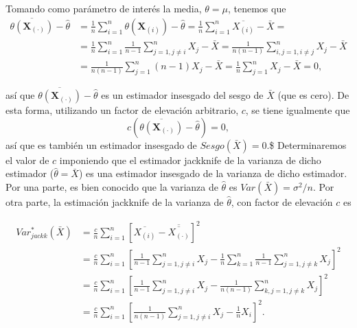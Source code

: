 \documentclass[]{book}
\theoremstyle{definition}
\theoremstyle{definition}
\theoremstyle{definition}
\theoremstyle{remark}
\begin{document}
Tomando como parámetro de interés la media, \(\theta =\mu\), tenemos que
\[\begin{aligned}
\overline{\theta \left( \mathbf{X}_{(\cdot)} \right)}-
\hat{\theta} &= \frac{1}{n}\sum_{i=1}^{n}\theta \left( 
\mathbf{X}_{(i)} \right) -\hat{\theta}=\frac{1}{n}\sum_{i=1}^{n}
\overline{X_{(i)}}-\bar{X}= \\
&= \frac{1}{n}\sum_{i=1}^{n}\frac{1}{n-1}\sum_{j=1,j\neq i}^{n}X_j-
\bar{X}=\frac{1}{n\left( n-1 \right)}\sum_{i,j=1,i\neq j}^{n}X_j-
\bar{X} \\
&= \frac{1}{n\left( n-1 \right)}\sum_{j=1}^{n}\left( n-1 \right) X_j-
\bar{X}=\frac{1}{n}\sum_{j=1}^{n}X_j-\bar{X}=0,\end{aligned}\]

así que
\(\overline{\theta \left( \mathbf{X}_{(\cdot)} \right)}-\hat{\theta}\)
es un estimador insesgado del sesgo de \(\bar{X}\) (que es cero). De
esta forma, utilizando un factor de elevación arbitrario, \(c\), se
tiene igualmente que
\[c\left( \overline{\theta \left( \mathbf{X}_{(\cdot)} \right)}
- \hat{\theta} \right) = 0,\] así que es también un estimador insesgado
de \(Sesgo\left( \bar{X} \right) =0.\)\$ Determinaremos el valor de
\(c\) imponiendo que el estimador jackknife de la varianza de dicho
estimador (\(\hat{\theta}=\bar{X}\)) es una estimador insesgado de la
varianza de dicho estimador. Por una parte, es bien conocido que la
varianza de \(\hat{\theta}\) es
\(Var\left( \bar{X} \right) = \sigma^2 /n\). Por otra parte, la
estimación jackknife de la varianza de \(\hat{\theta}\), con factor de
elevación \(c\) es

\[\begin{aligned}
Var_{jackk}^{\ast}\left( \bar{X} \right) &= \frac{c}{n}\sum_{i=1}^{n}
\left[ \overline{X_{(i)}}-\overline{\overline{X_{\left( \cdot
 \right)}}}\right]^2 \\
&= \frac{c}{n}\sum_{i=1}^{n}\left[ \frac{1}{n-1}\sum_{j=1,j\neq i}^{n}X_j-
\frac{1}{n}\sum_{k=1}^{n}\frac{1}{n-1}\sum_{j=1,j\neq k}^{n}X_j\right]^2
\\
&= \frac{c}{n}\sum_{i=1}^{n}\left[ \frac{1}{n-1}\sum_{j=1,j\neq i}^{n}X_j-
\frac{1}{n\left( n-1 \right)}\sum_{k,j=1,j\neq k}^{n}X_j\right]^2 \\
&= \frac{c}{n}\sum_{i=1}^{n}\left[ \frac{1}{n\left( n-1 \right)}
\sum_{j=1,j\neq i}^{n}X_j-\frac{1}{n}X_i\right]^2.\end{aligned}\]
\end{document}
